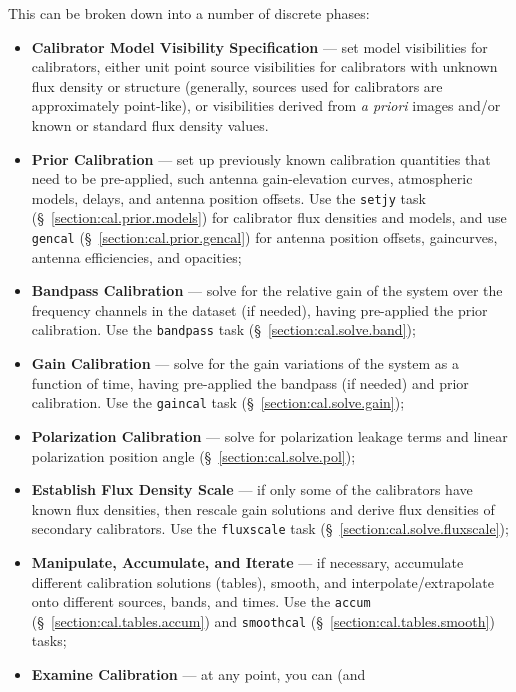 This can be broken down into a number of discrete phases:
\begin{itemize}
   \item {\bf Calibrator Model Visibility Specification} --- set
      model visibilities for calibrators, either unit point source
      visibilities for calibrators with unknown flux density or
      structure (generally, sources used for calibrators are
      approximately point-like), or visibilities derived from {\em a
      priori} images and/or known or standard flux density values.
   \item {\bf Prior Calibration} --- set up previously known
      calibration quantities that need to be pre-applied, such
      antenna
      gain-elevation curves, atmospheric models, delays, and
      antenna position offsets. Use the
      {\tt setjy} task (\S~\ref{section:cal.prior.models}) for
      calibrator flux
      densities and models, and use {\tt gencal} (\S~\ref{section:cal.prior.gencal})
      for antenna position offsets, gaincurves, antenna efficiencies,
      and opacities;
   \item {\bf Bandpass Calibration} --- solve
      for the relative gain of the system over the frequency channels 
      in the dataset (if needed), having pre-applied the prior
      calibration. Use the {\tt bandpass} task 
      (\S~\ref{section:cal.solve.band});
   \item {\bf Gain Calibration} --- solve for the gain variations of
      the system as a function of time, having pre-applied the 
      bandpass (if needed) and prior calibration. Use the 
      {\tt gaincal} task (\S~\ref{section:cal.solve.gain});
   \item {\bf Polarization Calibration} --- solve for 
      polarization leakage terms and linear polarization position angle
      (\S~\ref{section:cal.solve.pol});
   \item {\bf Establish Flux Density Scale} --- if only some of the
      calibrators have known flux densities, then rescale gain
      solutions and derive flux densities of secondary calibrators.
      Use the {\tt fluxscale} task (\S~\ref{section:cal.solve.fluxscale});
   \item {\bf Manipulate, Accumulate, and Iterate} --- if necessary,
      accumulate different calibration solutions (tables), smooth,
      and interpolate/extrapolate onto different sources, bands, and
      times. Use the {\tt accum} (\S~\ref{section:cal.tables.accum}) and
      {\tt smoothcal} (\S~\ref{section:cal.tables.smooth})
      tasks;
   \item {\bf Examine Calibration} --- at any point, you can (and 

\end{itemize}
